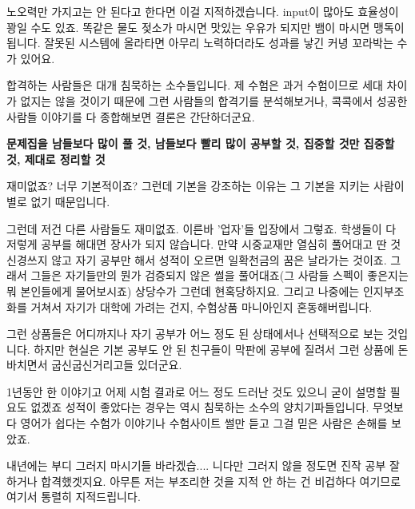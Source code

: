 노오력만 가지고는 안 된다고 한다면 이걸 지적하겠습니다.
input이 많아도 효율성이 꽝일 수도 있죠. 똑같은 물도 젖소가 마시면 맛있는 우유가 되지만 뱀이 마시면 맹독이 됩니다.
잘못된 시스템에 올라타면 아무리 노력하더라도 성과를 낳긴 커녕 꼬라박는 수가 있어요.
\vspace{5mm}

합격하는 사람들은 대개 침묵하는 소수들입니다. 제 수험은 과거 수험이므로 세대 차이가 없지는 않을 것이기 때문에
그런 사람들의 합격기를 분석해보거나, 콕콕에서 성공한 사람들 이야기를 다 종합해보면 결론은 간단하더군요.
\vspace{5mm}

\textbf{문제집을 남들보다 많이 풀 것, 남들보다 빨리 많이 공부할 것, 집중할 것만 집중할 것, 제대로 정리할 것}
\vspace{5mm}

재미없죠? 너무 기본적이죠? 그런데 기본을 강조하는 이유는 그 기본을 지키는 사람이 별로 없기 때문입니다.
\vspace{5mm}

그런데 저건 다른 사람들도 재미없죠. 이른바 '업자'들 입장에서 그렇죠.
학생들이 다 저렇게 공부를 해대면 장사가 되지 않습니다.
만약 시중교재만 열심히 풀어대고 딴 것 신경쓰지 않고 자기 공부만 해서 성적이 오르면 일확천금의 꿈은 날라가는 것이죠.
그래서 그들은 자기들만의 뭔가 검증되지 않은 썰을 풀어대죠(그 사람들 스펙이 좋은지는 뭐 본인들에게 물어보시죠)
상당수가 그런데 현혹당하지요. 그리고 나중에는 인지부조화를 거쳐서 자기가 대학에 가려는 건지, 수험상품 마니아인지 혼동해버립니다.
\vspace{5mm}

그런 상품들은 어디까지나 자기 공부가 어느 정도 된 상태에서나 선택적으로 보는 것입니다.
하지만 현실은 기본 공부도 안 된 친구들이 막판에 공부에 질려서 그런 상품에 돈바치면서 굽신굽신거리고들 있더군요.
\vspace{5mm}

1년동안 한 이야기고 어제 시험 결과로 어느 정도 드러난 것도 있으니 굳이 설명할 필요도 없겠죠
성적이 좋았다는 경우는 역시 침묵하는 소수의 양치기파들입니다.
무엇보다 영어가 쉽다는 수험가 이야기나 수험사이트 썰만 듣고 그걸 믿은 사람은 손해를 보았죠.
\vspace{5mm}

내년에는 부디 그러지 마시기들 바라겠습.... 니다만 그러지 않을 정도면 진작 공부 잘 하거나 합격했겟지요.
아무튼 저는 부조리한 것을 지적 안 하는 건 비겁하다 여기므로 여기서 통렬히 지적드립니다.
\vspace{5mm}






